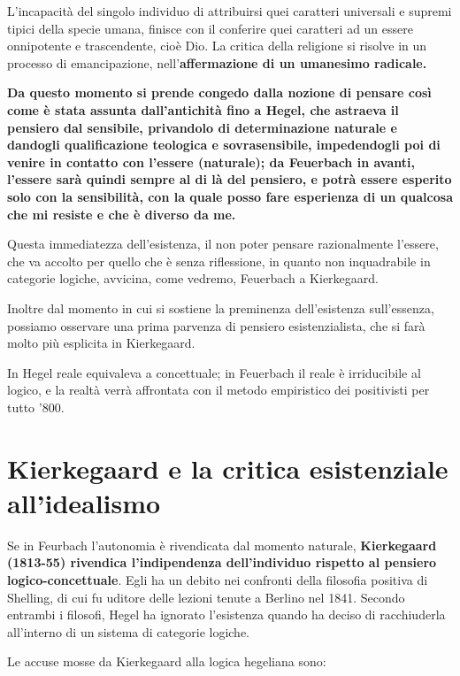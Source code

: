 L'incapacità del singolo individuo di attribuirsi quei caratteri universali e supremi tipici della specie umana, finisce con il conferire quei caratteri ad un essere onnipotente e trascendente, cioè Dio. La critica della religione si risolve in un processo di emancipazione, nell'\textbf{affermazione di un umanesimo radicale.}

\textbf{Da questo momento si prende congedo dalla nozione di pensare così come è stata assunta dall'antichità fino a Hegel, che astraeva il pensiero dal sensibile, privandolo di determinazione naturale e dandogli qualificazione teologica e sovrasensibile, impedendogli poi di venire in contatto con l'essere (naturale); da Feuerbach in avanti, l'essere sarà quindi sempre al di là del pensiero, e potrà essere esperito solo con la sensibilità, con la quale posso fare esperienza di un qualcosa che mi resiste e che è diverso da me.}

Questa immediatezza dell'esistenza, il non poter pensare razionalmente l'essere, che va accolto per quello che è senza riflessione, in quanto non inquadrabile in categorie logiche, avvicina, come vedremo, Feuerbach a Kierkegaard. 

Inoltre dal momento in cui si sostiene la preminenza dell'esistenza sull'essenza, possiamo osservare una prima parvenza di pensiero esistenzialista, che si farà molto più esplicita in Kierkegaard.

In Hegel reale equivaleva a concettuale; in Feuerbach il reale è irriducibile al logico, e la realtà verrà affrontata con il metodo empiristico dei positivisti per tutto '800.

\section{Kierkegaard e la critica esistenziale all'idealismo}

Se in Feurbach l'autonomia è rivendicata dal momento naturale, \textbf{Kierkegaard (1813-55) rivendica l'indipendenza dell'individuo rispetto al pensiero logico-concettuale}. Egli ha un debito nei confronti della filosofia positiva di Shelling, di cui fu uditore delle lezioni tenute a Berlino nel 1841. Secondo entrambi i filosofi, Hegel ha ignorato l'esistenza quando ha deciso di racchiuderla all'interno di un sistema di categorie logiche.

Le accuse mosse da Kierkegaard alla logica hegeliana sono:

